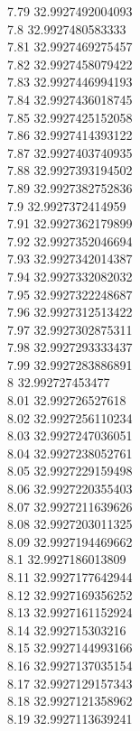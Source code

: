 {7.79	32.9927492004093\\
7.8	32.9927480583333\\
7.81	32.9927469275457\\
7.82	32.9927458079422\\
7.83	32.9927446994193\\
7.84	32.9927436018745\\
7.85	32.9927425152058\\
7.86	32.9927414393122\\
7.87	32.9927403740935\\
7.88	32.9927393194502\\
7.89	32.9927382752836\\
7.9	32.9927372414959\\
7.91	32.9927362179899\\
7.92	32.9927352046694\\
7.93	32.9927342014387\\
7.94	32.9927332082032\\
7.95	32.9927322248687\\
7.96	32.9927312513422\\
7.97	32.9927302875311\\
7.98	32.9927293333437\\
7.99	32.9927283886891\\
8	32.992727453477\\
8.01	32.992726527618\\
8.02	32.9927256110234\\
8.03	32.9927247036051\\
8.04	32.9927238052761\\
8.05	32.9927229159498\\
8.06	32.9927220355403\\
8.07	32.9927211639626\\
8.08	32.9927203011325\\
8.09	32.9927194469662\\
8.1	32.9927186013809\\
8.11	32.9927177642944\\
8.12	32.9927169356252\\
8.13	32.9927161152924\\
8.14	32.992715303216\\
8.15	32.9927144993166\\
8.16	32.9927137035154\\
8.17	32.9927129157343\\
8.18	32.9927121358962\\
8.19	32.9927113639241\\
}

